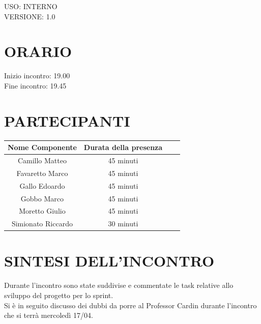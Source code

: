 \documentclass[5pt]{article}
\begin{document}
\begin{flushright}
    \begin{spacing}{1}
        USO: INTERNO\\
        VERSIONE: 1.0\\
    \end{spacing}
\end{flushright}


\restoregeometry

\pagebreak



\section{\Large ORARIO}
\begin{spacing}{1.5}
    {\large Inizio incontro: 19.00}\\
    {\large Fine incontro: 19.45}
\end{spacing}

\section{PARTECIPANTI}
\setlength\cellspacetoplimit{6pt}
\setlength\cellspacebottomlimit{6pt}

\begin{table}[ht]
  \begin{tabular}{|Sc|Sc|}
    \hline
    \textbf{Nome Componente} & \textbf{Durata della presenza} \\
    \hline
    Camillo Matteo & 45 minuti \\
    Favaretto Marco & 45 minuti \\
    Gallo Edoardo & 45 minuti \\
    Gobbo Marco & 45 minuti \\
    Moretto Giulio & 45 minuti \\
    Simionato Riccardo & 30 minuti \\
    \hline
  \end{tabular}
  \label{tab:conference}
\end{table}

\section{SINTESI DELL'INCONTRO}
Durante l'incontro sono state suddivise e commentate le task relative allo sviluppo del progetto per lo sprint.\\
Si è in seguito discusso dei dubbi da porre al Professor Cardin durante l'incontro che si terrà mercoledì 17/04.
\end{document}
